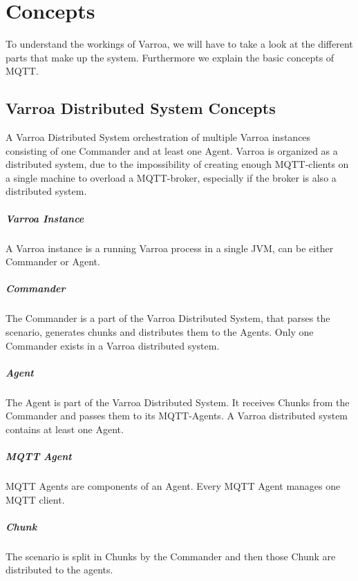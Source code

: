 \chapter{Concepts}
To understand the workings of Varroa, we will have to take a look at the different parts that make up the system.
Furthermore we explain the basic concepts of MQTT.

\section{Varroa Distributed System Concepts}
A Varroa Distributed System orchestration of multiple Varroa instances consisting of one Commander and at least one Agent.
Varroa is organized as a distributed system, due to the impossibility of creating enough MQTT-clients on a single machine to overload a MQTT-broker, especially if the broker is also a distributed system.

\paragraph{Varroa Instance}
A Varroa instance is a running Varroa process in a single JVM, can be either Commander or Agent.

\paragraph{Commander}
The Commander is a part of the Varroa Distributed System, that parses the scenario, generates chunks and distributes them to the Agents.
Only one Commander exists in a Varroa distributed system.

\paragraph{Agent}
The Agent is part of the Varroa Distributed System.
It receives Chunks from the Commander and passes them to its MQTT-Agents.
A Varroa distributed system contains at least one Agent.

\paragraph{MQTT Agent}
MQTT Agents are components of an Agent.
Every MQTT Agent manages one MQTT client.

\paragraph{Chunk}
The scenario is split in Chunks by the Commander and then those Chunk are distributed to the agents.

